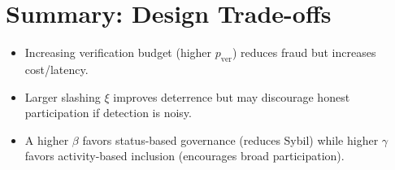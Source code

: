 \documentclass[11pt,a4paper]{article}
\begin{document}
\section{Summary: Design Trade-offs}
\begin{itemize}
  \item Increasing verification budget (higher \(p_{\text{ver}}\)) reduces fraud but increases cost/latency.
  \item Larger slashing \(\xi\) improves deterrence but may discourage honest participation if detection is noisy.
  \item A higher \(\beta\) favors status-based governance (reduces Sybil) while higher \(\gamma\) favors activity-based inclusion (encourages broad participation).
\end{itemize}
\end{document}
